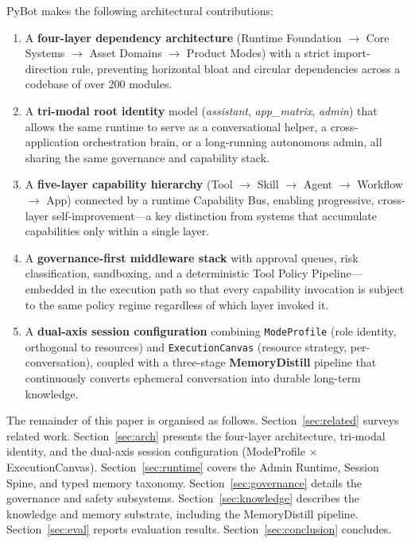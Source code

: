 \documentclass[11pt,a4paper]{article}
\begin{document}
\noindent PyBot makes the following architectural contributions:

\begin{enumerate}[label=\textbf{C\arabic*.}]
  \item A \textbf{four-layer dependency architecture} (Runtime Foundation $\to$ Core Systems $\to$ Asset Domains $\to$ Product Modes) with a strict import-direction rule, preventing horizontal bloat and circular dependencies across a codebase of over 200 modules.
  \item A \textbf{tri-modal root identity} model (\textit{assistant}, \textit{app\_matrix}, \textit{admin}) that allows the same runtime to serve as a conversational helper, a cross-application orchestration brain, or a long-running autonomous admin, all sharing the same governance and capability stack.
  \item A \textbf{five-layer capability hierarchy} (Tool $\to$ Skill $\to$ Agent $\to$ Workflow $\to$ App) connected by a runtime Capability Bus, enabling progressive, cross-layer self-improvement---a key distinction from systems that accumulate capabilities only within a single layer.
  \item A \textbf{governance-first middleware stack} with approval queues, risk classification, sandboxing, and a deterministic Tool Policy Pipeline---embedded in the execution path so that every capability invocation is subject to the same policy regime regardless of which layer invoked it.
  \item A \textbf{dual-axis session configuration} combining \texttt{ModeProfile} (role identity, orthogonal to resources) and \texttt{ExecutionCanvas} (resource strategy, per-conversation), coupled with a three-stage \textbf{MemoryDistill} pipeline that continuously converts ephemeral conversation into durable long-term knowledge.
\end{enumerate}

The remainder of this paper is organised as follows.
Section~\ref{sec:related} surveys related work.
Section~\ref{sec:arch} presents the four-layer architecture, tri-modal identity, and the dual-axis session configuration (ModeProfile $\times$ ExecutionCanvas).
Section~\ref{sec:runtime} covers the Admin Runtime, Session Spine, and typed memory taxonomy.
Section~\ref{sec:governance} details the governance and safety subsystems.
Section~\ref{sec:knowledge} describes the knowledge and memory substrate, including the MemoryDistill pipeline.
Section~\ref{sec:eval} reports evaluation results.
Section~\ref{sec:conclusion} concludes.
\end{document}
